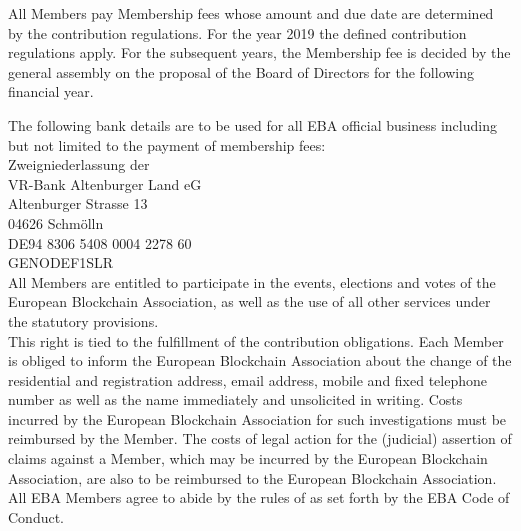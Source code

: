 \documentclass{article}
\begin{document}
All Members pay Membership fees whose amount and due date are determined by the contribution regulations. 
For the year 2019 the defined contribution regulations apply. 
For the subsequent years, the Membership fee is decided by the general assembly on the proposal of the Board of Directors for the following financial year.  \\


\noindent The following bank details are to be used for all EBA official business including but not limited to the payment of membership fees:\\

Zweigniederlassung der\\
VR-Bank Altenburger Land eG\\
Altenburger Strasse 13\\
04626 Schmölln\\

DE94 8306 5408 0004 2278 60\\

GENODEF1SLR\\

All Members are entitled to participate in the events, elections and votes of the European Blockchain Association, as well as the use of all other services under the statutory provisions. \\

This right is tied to the fulfillment of the contribution obligations.
Each Member is obliged to inform the European Blockchain Association about the change of the residential and registration address, email address, mobile and fixed telephone number as well as the name immediately and unsolicited in writing. 
Costs incurred by the European Blockchain Association for such investigations must be reimbursed by the Member. 
The costs of legal action for the (judicial) assertion of claims against a Member, which may be incurred by the European Blockchain Association, are also to be reimbursed to the European Blockchain Association. \\

All EBA Members agree to abide by the rules of as set forth by the EBA Code of Conduct.
\end{document}
